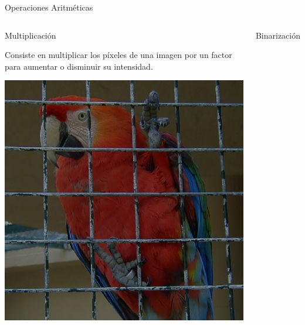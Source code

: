 \documentclass{beamer}
\begin{document}
\begin{frame}{Operaciones Aritméticas}
\begin{columns}
\column[t]{5.9cm}
\begin{center}
\begin{block}{Multiplicación}
\justifying

Consiste en multiplicar los píxeles de una imagen por un factor para aumentar o disminuir su intensidad.
\end{block}
\vspace{0.5cm}
\includegraphics[scale=0.15]{./.Presentation/parrot_multiplied}
\end{center}

\column[t]{5.9cm}
\begin{center}
\begin{block}{Binarización}
\justifying


\end{block}
\end{center}
\end{columns}
\end{frame}
\end{document}
